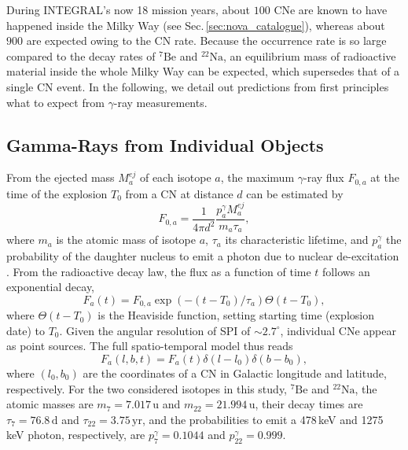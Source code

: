 \documentclass{aa}
\newcommand{\mrm}[1]{\mathrm{#1}}
\newcommand{\nuc}[2]{$\mrm{^{#2}#1}$}
\begin{document}
During INTEGRAL's now 18 mission years, about $100$ CNe are known to have happened inside the Milky Way (see Sec.\,\ref{sec:nova_catalogue}), whereas about $900$ are expected owing to the CN rate.
%
Because the occurrence rate is so large compared to the decay rates of \nuc{Be}{7} and \nuc{Na}{22}, an equilibrium mass of radioactive material inside the whole Milky Way can be expected, which supersedes that of a single CN event.
%
In the following, we detail out predictions from first principles what to expect from $\gamma$-ray measurements.


\subsection{Gamma-Rays from Individual Objects}\label{sec:individual_objects}
%
From the ejected mass $M_a^{ej}$ of each isotope $a$, the maximum $\gamma$-ray flux $F_{0,a}$ at the time of the explosion $T_0$ from a CN at distance $d$ can be estimated by
%
\begin{equation}
F_{0,a} = \frac{1}{4 \pi d^2}\frac{p_a^{\gamma} M_a^{ej}}{m_a \tau_a}\mrm{,}
\label{eq:max_flux}
\end{equation}
%
\noindent where $m_a$ is the atomic mass of isotope $a$, $\tau_a$ its characteristic lifetime, and $p_a^{\gamma}$ the probability of the daughter nucleus to emit a photon due to nuclear de-excitation \citep{Thielemann2018_AwR}.
%
From the radioactive decay law, the flux as a function of time $t$ follows an exponential decay,
%
\begin{equation}
F_a(t) = F_{0,a} \exp(-(t-T_0)/\tau_a)\Theta(t-T_0)\mrm{,}
\end{equation}
%
\noindent where $\Theta(t-T_0)$ is the Heaviside function, setting starting time (explosion date) to $T_0$.
%
Given the angular resolution of SPI of $\sim 2.7^{\circ}$, individual CNe appear as point sources.
%
The full spatio-temporal model thus reads
%
\begin{equation}
F_a(l,b,t) = F_a(t) \delta(l-l_0) \delta(b-b_0)\mrm{,}
\end{equation}
%
\noindent where $(l_0,b_0)$ are the coordinates of a CN in Galactic longitude and latitude, respectively.
%
For the two considered isotopes in this study, \nuc{Be}{7} and \nuc{Na}{22}, the atomic masses are $m_{7} = 7.017\,\mrm{u}$ and $m_{22} = 21.994\,\mrm{u}$, their decay times are $\tau_7 = 76.8\,\mrm{d}$ and $\tau_{22} = 3.75\,\mrm{yr}$, and the probabilities to emit a 478\,keV and 1275\,keV photon, respectively, are $p_7^{\gamma} = 0.1044$ and $p_{22}^{\gamma} = 0.999$.
\end{document}
